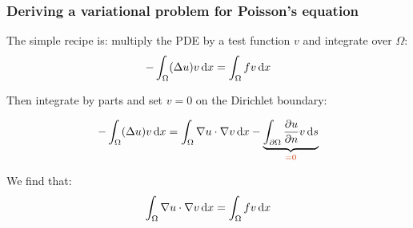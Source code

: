 \begin{frame}
  \frametitle{Deriving a variational problem for Poisson's equation}

  The simple recipe is: multiply the PDE by a test function $v$ and
  integrate over $\Omega$:
  \begin{equation*}
    -\int_\Omega (\Delta u)v \, \mathrm{d}x = \int_\Omega fv\, \mathrm{d}x
  \end{equation*}

  Then integrate by parts and set $v = 0$ on the Dirichlet boundary:

  \begin{equation*}
    -\int_\Omega (\Delta u) v \dx
    = \int_\Omega \nabla u\cdot\nabla v\dx -
   \underbrace{\int_{\partial\Omega} \frac{\partial u}{\partial n} v\ds}_{\textcolor{fenicsred}{=0}}
  \end{equation*}

  We find that:
  \begin{equation*}
    \int_\Omega\nabla u\cdot\nabla v\, \mathrm{d}x = \int_\Omega fv\, \mathrm{d}x
  \end{equation*}

\end{frame}

